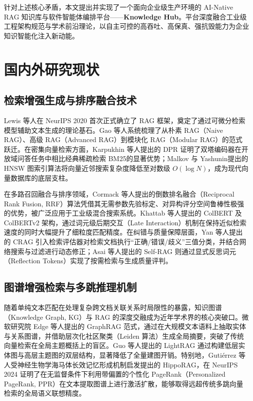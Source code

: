针对上述核心矛盾，本文提出并实现了一个面向企业级生产环境的 AI-Native RAG 知识库与软件智能体编排平台——\textbf{Knowledge Hub}。平台深度融合工业级工程架构规范与学术前沿理论，以自主可控的高吞吐、高保真、强抗毁能力为企业知识智能化注入新动能。

\section{国内外研究现状}

\subsection{检索增强生成与排序融合技术}
Lewis 等人\cite{Lewis2020RAG}在 NeurIPS 2020 首次正式确立了 RAG 框架，奠定了通过可微分检索模型辅助文本生成的理论基石。Gao 等人\cite{Gao2023RAGSurvey}系统梳理了从朴素 RAG（Naive RAG）、高级 RAG（Advanced RAG）到模块化 RAG（Modular RAG）的范式跃迁。在密集向量检索方面，Karpukhin 等人\cite{Karpukhin2020DPR}提出的 DPR 证明了双塔编码器在开放域问答任务中相比经典稀疏检索 BM25\cite{Robertson2009BM25}的显著优势；Malkov 与 Yashunin\cite{Malkov2018HNSW}提出的 HNSW 图索引算法将向量近邻搜索复杂度降低至对数级 $O(\log N)$，成为现代向量数据库的底层支柱。

在多路召回融合与排序领域，Cormack 等人\cite{Cormack2009RRF}提出的倒数排名融合（Reciprocal Rank Fusion, RRF）算法凭借其无需参数先验标定、对异构评分空间鲁棒性极强的优势，被广泛应用于工业级混合搜索系统。Khattab 等人\cite{Khattab2020ColBERT,Santhanam2022ColBERTv2}提出的 ColBERT 及 ColBERTv2 架构，通过词元级后期交互（Late Interaction）机制在保持近似检索速度的同时大幅提升了细粒度匹配精度。在纠错与质量保障层面，Yan 等人\cite{Yan2024CRAG}提出的 CRAG 引入检索评估器对检索文档执行“正确/错误/歧义”三值分类，并结合网络搜索与过滤进行动态修正；Asai 等人\cite{Asai2023SelfRAG}提出的 Self-RAG 则通过显式反思词元（Reflection Tokens）实现了按需检索与生成质量评判。

\subsection{图谱增强检索与多跳推理机制}
随着单纯文本匹配在处理复杂跨文档关联关系时局限性的暴露，知识图谱（Knowledge Graph, KG）与 RAG 的深度交融成为近年学术界的核心突破口。微软研究院 Edge 等人\cite{Edge2024GraphRAG}提出的 GraphRAG 范式，通过在大规模文本语料上抽取实体与关系图谱，并借助层次化社区聚类（Leiden 算法）生成全局摘要，突破了传统向量检索在全局主题概括上的盲区。Guo 等人\cite{Guo2024LightRAG}提出的 LightRAG 通过构建低层实体图与高层主题图的双层结构，显著降低了全量建图开销。特别地，Guti{\'e}rrez 等人\cite{Gutierrez2024HippoRAG}受神经生物学海马体长效记忆形成机制启发提出的 HippoRAG，在 NeurIPS 2024 证明了在无监督条件下利用带偏置的个性化 PageRank（Personalized PageRank, PPR）\cite{Page1999PageRank,Haveliwala2002TopicPageRank}在文本提取图谱上进行激活扩散，能够取得远超传统多跳向量检索的全局语义联想精度。

